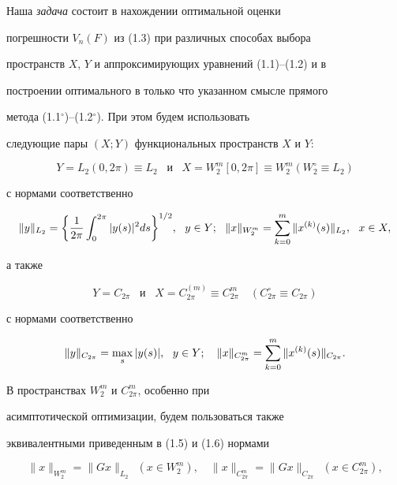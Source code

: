 Наша {\it задача} состоит в нахождении оптимальной оценки


погрешности $V_n(F)$ из (1.3) при различных способах выбора


пространств $X$, $Y$ и аппроксимирующих уравнений (1.1)--(1.2) и в


построении оптимального в только что указанном смысле прямого


метода (1.1$^\circ$)--(1.2$^\circ$). При этом будем использовать


следующие пары $(X;Y)$ функциональных пространств $X$ и $Y$:


$$


Y = L_2(0,2\pi) \equiv L_2 \ \; \text{ и }\ \; X = W_2^m[0,2\pi] \equiv


W_2^m(W_2^\circ\equiv L_2)


$$


с нормами соответственно


\begin{equation}


\|y\|_{L_2}=\bigg\{\frac{1}{2\pi}\int_0^{2\pi} |y(s)|^2 ds


\bigg\}^{1/2},\ \ y\in Y;\ \  \|x\|_{W_2^m} =


\suml_{k=0}^m \|x^{(k)}(s)\|_{L_2},\ \ x\in X,


\end{equation}


а также


$$


Y=C_{2\pi}\ \; \text{ и }\ \; X = C_{2\pi}^{(m)} \equiv C_{2\pi}^m\quad


(C_{2\pi}^\circ \equiv C_{2\pi})


$$


с нормами соответственно


\begin{equation}


\|y\|_{C_{2\pi}} = \max\limits_{s}|y(s)|,\ \ y\in Y;\quad


\|x\|_{C_{2\pi}^m} = \suml_{k=0}^m \|x^{(k)}(s)\|_{C_{2\pi}}.


\end{equation}


В пространствах $W_2^m$ и $C_{2\pi}^m$, особенно при


асимптотической оптимизации, будем пользоваться также


эквивалентными приведенным в (1.5) и (1.6) нормами


\begin{equation}


\|x\|_{W_2^m} = \|Gx\|_{L_2}\ \ (x\in W_2^m),\quad


\|x\|_{C_{2\pi}^m} = \|Gx\|_{C_{2\pi}}\ \ (x\in C_{2\pi}^m),


\end{equation}


